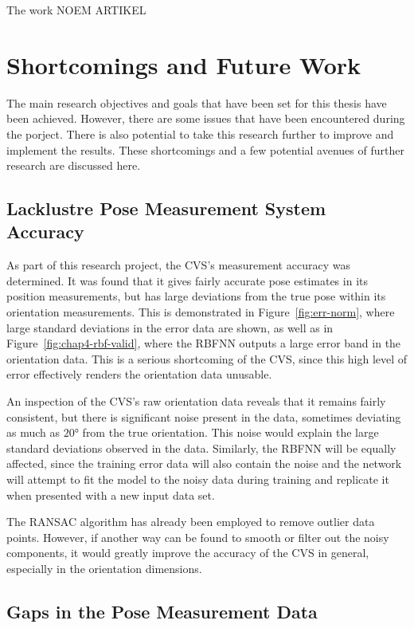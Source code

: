 The work NOEM ARTIKEL

\section{Shortcomings and Future Work}

The main research objectives and goals that have been set for this thesis have been achieved. However, there are some issues that have been encountered during the porject. There is also potential to take this research further to improve and implement the results. These shortcomings and a few potential avenues of further research are discussed here. 

\subsection{Lacklustre Pose Measurement System Accuracy}

As part of this research project, the CVS's measurement accuracy was determined. It was found that it gives fairly accurate pose estimates in its position measurements, but has large deviations from the true pose within its orientation measurements. This is demonstrated in Figure~\ref{fig:err-norm}, where large standard deviations in the error data are shown, as well as in Figure~\ref{fig:chap4-rbf-valid}, where the RBFNN outputs a large error band in the orientation data. This is a serious shortcoming of the CVS, since this high level of error effectively renders the orientation data unusable. 

An inspection of the CVS's raw orientation data reveals that it remains fairly consistent, but there is significant noise present in the data, sometimes deviating as much as $\ang{20}$ from the true orientation. This noise would explain the large standard deviations observed in the data. Similarly, the RBFNN will be equally affected, since the training error data will also contain the noise and the network will attempt to fit the model to the noisy data during training and replicate it when presented with a new input data set. 

The RANSAC algorithm has already been employed to remove outlier data points. However, if another way can be found to smooth or filter out the noisy components, it would greatly improve the accuracy of the CVS in general, especially in the orientation dimensions. 

\subsection{Gaps in the Pose Measurement Data}

